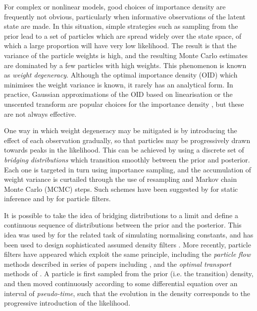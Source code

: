 \documentclass{article}
\begin{document}
For complex or nonlinear models, good choices of importance density are frequently not obvious, particularly when informative observations of the latent state are made. In this situation, simple strategies such as sampling from the prior lead to a set of particles which are spread widely over the state space, of which a large proportion will have very low likelihood. The result is that the variance of the particle weights is high, and the resulting Monte Carlo estimates are dominated by a few particles with high weights. This phenomenon is known as \emph{weight degeneracy}. Although the optimal importance density (OID) which minimises the weight variance is known, it rarely has an analytical form. In practice, Gaussian approximations of the OID based on linearisation or the unscented transform are popular choices for the importance density \citep{Doucet2000a,Merwe2000}, but these are not always effective.

One way in which weight degeneracy may be mitigated is by introducing the effect of each observation gradually, so that particles may be progressively drawn towards peaks in the likelihood. This can be achieved by using a discrete set of \emph{bridging distributions} which transition smoothly between the prior and posterior. Each one is targeted in turn using importance sampling, and the accumulation of weight variance is curtailed through the use of resampling and Markov chain Monte Carlo (MCMC) steps. Such schemes have been suggested by \citet{Neal2001,DelMoral2006} for static inference and by \citet{Godsill2001b,Gall2007,Deutscher2000,Oudjane2000} for particle filters.

It is possible to take the idea of bridging distributions to a limit and define a continuous sequence of distributions between the prior and the posterior. This idea was used by \citet{Gelman1998} for the related task of simulating normalising constants, and has been used to design sophisticated assumed density filters \citep{Hanebeck2003a,Hanebeck2012,Hagmar2011}. More recently, particle filters have appeared which exploit the same principle, including the \emph{particle flow} methods described in series of papers including \citep{Daum2008,Daum2011d}, and the \emph{optimal transport} methods of \cite{Reich2011,Reich2012a}. A particle is first sampled from the prior (i.e. the transition) density, and then moved continuously according to some differential equation over an interval of \emph{pseudo-time}, such that the evolution in the density corresponds to the progressive introduction of the likelihood.
\end{document}
